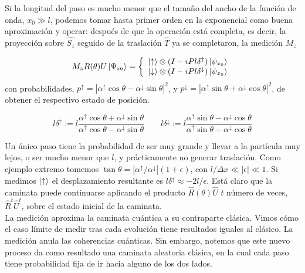 Si la longitud del paso es mucho menor que el tamaño del ancho de la función de onda, $x_0\gg l$, podemos tomar hasta primer orden en la exponencial como buena aproximación y operar:
después de que la operación está completa, es decir, la proyección sobre $\hat{S_z}$ seguido de la traslación $\hat{T}$ ya se completaron, la medición $M_z$ 

\begin{equation}
    M_zR(\theta)U\ket{\Psi_{in}}=
    \left\{
    \begin{array}{cc}
    \ket{\uparrow}\otimes(I-iPl\delta^\uparrow)\ket{\psi_{x_0}}\\
    \ket{\downarrow}\otimes(I-iPl\delta^\downarrow)\ket{\psi_{x_0}}
    \end{array}{}
    \right.
\end{equation}{}
con probabilidades, $p^\uparrow=|\alpha^\uparrow\cos{\theta}-\alpha^\downarrow\sin\theta|^2$, y $p^\downarrow=|\alpha^\uparrow\sin{\theta}+\alpha^\downarrow\cos\theta|^2$, de obtener el respectivo estado de posición.

\begin{equation}
    l\delta^\uparrow:=l\dfrac{\alpha^\uparrow \cos{\theta+\alpha^\downarrow\sin{\theta}}}{\alpha^\uparrow\cos\theta-\alpha^\downarrow\sin\theta}\qquad l\delta^\downarrow:=l\dfrac{\alpha^\uparrow \sin{\theta-\alpha^\downarrow\cos{\theta}}}{\alpha^\uparrow\sin\theta-\alpha^\downarrow\cos\theta}
\end{equation}{}

Un único paso tiene la probabilidad de ser muy grande y llevar a la partícula muy lejos, o ser mucho menor que $l$, y prácticamente no generar traslación. Como ejemplo extremo tomemos $\tan\theta=|\alpha^{\uparrow}/\alpha^{\downarrow}|(1+\epsilon)$, con $l/ \Delta x \ll |\epsilon| \ll1$. Si medimos $\ket{\uparrow}$ el desplazamiento resultante es $l\delta^{\uparrow}\approx -2l/\epsilon$.
Está claro que la caminata puede continuarse aplicando el producto $\hat{R}(\theta)\hat{U}$ $t$ número de veces, $\hat{R}^t\hat{U}^t$, sobre el estado inicial de la caminata.\\

La medición aproxima la caminata cuántica a su contraparte clásica. Vimos cómo el caso límite de medir tras cada evolución tiene resultados iguales al clásico. La medición anula las coherencias cuánticas.
Sin embargo, notemos que este nuevo proceso da como resultado una caminata aleatoria clásica, en la cual cada paso tiene probabilidad fija de ir hacia alguno de los dos lados.

